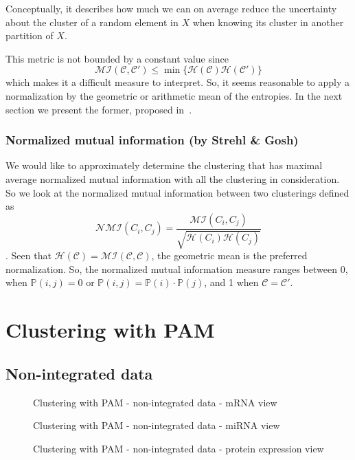 Conceptually, it describes how much we can on average reduce the uncertainty about the cluster of a random element in $X$ when knowing its cluster in another partition of $X$.

This metric is not bounded by a constant value since
\begin{equation*}
    \mathcal{MI}(\mathcal{C},\mathcal{C}')\leq\min\{\mathcal{H}(\mathcal{C})\mathcal{H}(\mathcal{C}')\}
\end{equation*}
which makes it a difficult measure to interpret. So, it seems reasonable to apply a normalization by the geometric or arithmetic mean of the entropies. In the next section we present the former, proposed in~\cite{StrehlA2003Ce-A}.

\subsubsection{Normalized mutual information (by Strehl \& Gosh)}
We would like to approximately determine the clustering that has maximal average normalized mutual information with all the clustering in consideration. So we look at the normalized mutual information between two clusterings defined as
\begin{equation*}
    \mathcal{NMI}(C_i, C_j) = \frac{\mathcal{MI}(C_i, C_j)}{\sqrt{\mathcal{H}(C_i) \mathcal{H}(C_j)}}
\end{equation*}.
Seen that $\mathcal{H}(\mathcal{C})=\mathcal{MI}(\mathcal{C},\mathcal{C})$, the geometric mean is the preferred normalization. So, the normalized mutual information measure ranges between 0, when $\mathbb{P}(i,j)=0$ or $\mathbb{P}(i,j)=\mathbb{P}(i)\cdot\mathbb{P}(j)$, and 1 when $\mathcal{C}=\mathcal{C}'$.

\section{Clustering with PAM}\label{results_pam}
\subsection{Non-integrated data}\label{pam_nonIntegrated}
\begin{figure}\label{fig:pam_1}
    \centering
    \caption{Clustering with PAM - non-integrated data - mRNA view}
\end{figure}
\begin{figure}\label{fig:pam_2}
    \centering
    \caption{Clustering with PAM - non-integrated data - miRNA view}
\end{figure}
\begin{figure}\label{fig:pam_3}
    \centering
    \caption{Clustering with PAM - non-integrated data - protein expression view}
\end{figure}

